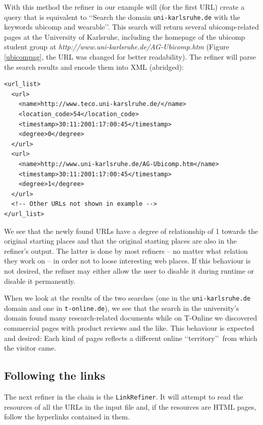 \documentclass[a4paper]{danarticle}
\theoremstyle{remark}
\begin{document}
      With this method the refiner in our example will (for the first URL)
      create a query that is equivalent to \lq\lq Search the domain
      \verb$uni-karlsruhe.de$ with the keywords ubicomp and wearable\rq\rq .
      This search will return several ubicomp-related pages at the University of
      Karlsruhe, including the homepage of the ubicomp student group at 
      \textit{http://www.uni-karlsruhe.de/AG-Ubicomp.htm} (Figure
      \ref{ubicompag}, the URL
      was changed for better readability). The refiner will parse the search
      results and encode them into XML (abridged):
      \begin{verbatim}
<url_list>
  <url> 
    <name>http://www.teco.uni-karslruhe.de/</name> 
    <location_code>54</location_code> 
    <timestamp>30:11:2001:17:00:45</timestamp> 
    <degree>0</degree> 
  </url> 
  <url>
    <name>http://www.uni-karlsruhe.de/AG-Ubicomp.htm</name> 
    <timestamp>30:11:2001:17:00:45</timestamp> 
    <degree>1</degree> 
  </url>
  <!-- Other URLs not shown in example --> 
</url_list>
      \end{verbatim}
      
      We see that the newly found URLs have a degree of relationship of 1
      towards the original starting places and that the original starting places
      are also in the refiner's output. The latter is done by most refiners -- no
      matter what relation they work on -- in order not to loose interesting web
      places. If this behaviour is not desired, the refiner may either allow the
      user to disable it during runtime or disable it permanently.
      
      When we look at the results of the two searches 
      (one in the \verb$uni-karlsruhe.de$ domain and one in \verb$t-online.de$),
      we see that the search in the university's domain found many
      research-related documents while on T-Online we discovered commercial pages
      with product reviews and the like. This behaviour is expected and desired: 
      Each kind
      of pages reflects a different online \lq\lq territory\rq\rq\ from which
      the visitor came.
    \subsection{Following the links}
      The next refiner in the chain is the \verb$LinkRefiner$. It will attempt
      to read the resources of all the URLs in the input file and, if the
      resources are HTML pages, follow the hyperlinks contained in them.
      
\end{document}
